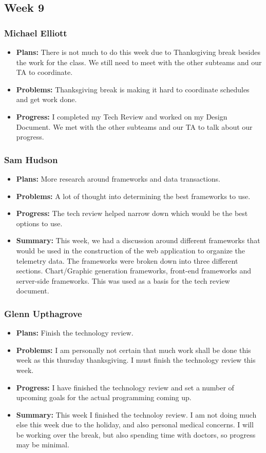 \documentclass[onecolumn, draftclsnofoot,10pt, compsoc]{IEEEtran}
\begin{document}
\subsection {Week 9}
\subsubsection{Michael Elliott}
\begin {itemize}
\item \textbf{Plans: }
  There is not much to do this week due to Thanksgiving break besides the work for the class. We still need to meet with the other subteams and our TA to coordinate.
\item \textbf{Problems: }
  Thanksgiving break is making it hard to coordinate schedules and get work done.
\item \textbf{Progress: }
  I completed my Tech Review and worked on my Design Document. We met with the other subteams and our TA to talk about our progress.
\end {itemize}
\subsubsection{Sam Hudson}
\begin {itemize}
\item \textbf{Plans: }More research around frameworks and data transactions. 
\item \textbf{Problems: }A lot of thought into determining the best frameworks to use.
\item \textbf{Progress: }The tech review helped narrow down which would be the best options to use.
\item \textbf{Summary: }This week, we had a discussion around different frameworks that would be used in the construction of the web application to organize the telemetry data.  The frameworks were broken down into three different sections. Chart/Graphic generation frameworks, front-end frameworks and server-side frameworks. This was used as a basis for the tech review document. 
\end {itemize}
\subsubsection{Glenn Upthagrove}
\begin {itemize}
 \item \textbf{Plans: }Finish the technology review. 
 \item \textbf{Problems: }I am personally not certain that much work shall be done this week as this thursday thanksgiving. I must finish the technology review this week.
 \item \textbf{Progress: }I have finished the technology review and set a number of upcoming goals for the actual programming coming up. 
 \item \textbf{Summary: }This week I finished the technoloy review. I am not doing much else this week due to the holiday, and also personal medical concerns. I will be working over the break, but also spending time with doctors, so progress may be minimal. 
\end {itemize}
\end{document}
